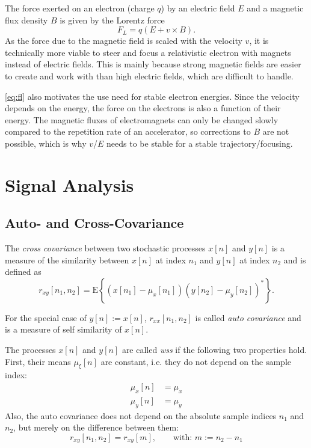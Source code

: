 The force exerted on an electron (charge $q$) by an electric field $E$ and a magnetic flux density $B$ is given by the Lorentz force \cite[p.~19]{Hinterberger1997}
\begin{equation}\label{eq:fl}
F_L = q\left(E+v\times B\right).
\end{equation}
As the force due to the magnetic field is scaled with the velocity $v$, it is technically more viable to steer and focus a relativistic electron with magnets instead of electric fields. This is mainly because strong magnetic fields are easier to create and work with than high electric fields, which are difficult to handle. \cite[p.~27]{Krieger2013}

\autoref{eq:fl} also motivates the use need for stable electron energies. Since the velocity depends on the energy, the force on the electrons is also a function of their energy. The magnetic fluxes of electromagnets can only be changed slowly compared to the repetition rate of an accelerator, so corrections to $B$ are not possible, which is why $v$/$E$ needs to be stable for a stable trajectory/focusing.




\section{Signal Analysis}
\subsection{Auto- and Cross-Covariance}
The \textit{cross covariance} between two stochastic processes $x[n]$ and $y[n]$ is a measure of the similarity between $x[n]$ at index $n_1$ and $y[n]$ at index $n_2$ and is defined as
\begin{equation}\label{eq:crosscovariance}
r_{xy}[n_1,n_2] = \text{E}\left\{(x[n_1]-\mu_x[n_1])(y[n_2]-\mu_y[n_2])^\ast\right\}.
\end{equation}

For the special case of $y[n]:=x[n]$, $r_{xx}[n_1,n_2]$ is called \textit{auto covariance} and is a measure of self similarity of $x[n]$. \cite[p.~172]{Park2017}

The processes $x[n]$ and $y[n]$ are called \textit{\gls{wss}} if the following two properties hold. \cite[p.~167]{Park2017}
First, their means $\mu_{\xi}[n]$ are constant, i.e. they do not depend on the sample index:
\begin{align}\label{eq:wss}
\mu_{x}[n] &= \mu_x\\
\mu_{y}[n] &= \mu_y
\end{align}
Also, the auto covariance does not depend on the absolute sample indices $n_1$ and $n_2$, but merely on the difference between them:
\begin{equation}
r_{xy}[n_1,n_2] = r_{xy}[m],\qquad \text{with: } m:=n_2-n_1
\end{equation}

